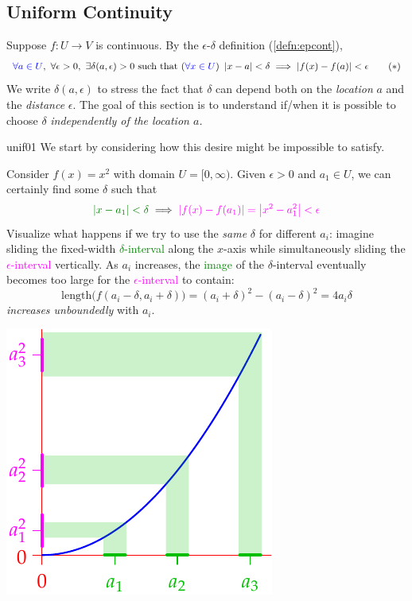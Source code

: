 \subsection{Uniform Continuity}\label{sec:uniformcont}

Suppose $f:U\to V$ is continuous. By the $\epsilon$-$\delta$ definition (\ref{defn:epcont}),
\[
	\textcolor{blue}{\forall a\in U},\ \forall \epsilon>0,\ \exists \delta(a,\epsilon)>0\text{ such that }(\textcolor{blue}{\forall x\in U})\ \nm{x-a}<\delta\implies\nm{f(x)-f(a)}<\epsilon\tag{$\ast$}
\]
We write $\delta(a,\epsilon)$ to stress the fact that $\delta$ can depend both on the \emph{location} $a$ and the \emph{distance} $\epsilon$. The goal of this section is to understand if/when it is possible to choose $\delta$ \emph{independently of the location $a$.}

\begin{example}{}{unif01}
	We start by considering how this desire might be impossible to satisfy.\par
	\begin{minipage}[t]{0.6\linewidth}\vspace{-3pt}
		Consider $f(x)=x^2$ with domain $U=[0,\infty)$. Given $\epsilon>0$ and $a_1\in U$, we can certainly find some\footnotemark{} $\delta$ such that
		\[
			\textcolor{Green}{\nm{x-a_1}<\delta}\implies \textcolor{Magenta}{\nm{f(x)-f(a_1)}=\nm{x^2-a_1^2}<\epsilon}
		\]
		Visualize what happens if we try to use the \emph{same} $\delta$ for different $a_i$: imagine sliding the fixed-width \textcolor{Green}{$\delta$-interval} along the $x$-axis while simultaneously sliding the \textcolor{Magenta}{$\epsilon$-interval} vertically. As $a_i$ increases, the \textcolor{Green}{image} of the $\delta$-interval eventually becomes too large for the \textcolor{Magenta}{$\epsilon$-interval} to contain:
		\[
			\text{length}\bigl(f(a_i-\delta,a_i+\delta)\bigr) =(a_i+\delta)^2-(a_i-\delta)^2=4a_i\delta
		\]
		\emph{increases unboundedly} with $a_i$.
	\end{minipage}
	\hfill
	\begin{minipage}[t]{0.39\linewidth}\vspace{0pt}
		\flushright\includegraphics{unifcont}
	\end{minipage}\smallbreak
	

\end{example}
